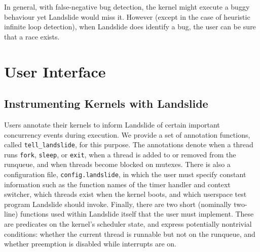 \documentclass{llncs}
\begin{document}
In general, with false-negative bug detection, the kernel might execute a buggy behaviour yet Landslide would miss it. However (except in the case of heuristic infinite loop detection), when Landslide does identify a bug, the user can be sure that a race exists.



\squish
\section{User Interface}
\squish
\label{sec:interface}

\subsection{Instrumenting Kernels with Landslide}
\squish
\label{sec:instrument}

Users annotate their kernels to inform Landslide of certain important concurrency events during execution. We provide a set of annotation functions, called \texttt{tell\_landslide}, for this purpose. The annotations denote when a thread runs \texttt{fork}, \texttt{sleep}, or \texttt{exit}, when a thread is added to or removed from the runqueue, and when threads become blocked on mutexes.
There is also a configuration file, \texttt{config.landslide}, in which the user must specify constant information such as the function names of the timer handler and context switcher, which threads exist when the kernel boots, and which userspace test program Landslide should invoke.
Finally, there are two short (nominally two-line) functions used within Landslide itself that the user must implement. These are predicates on the kernel's scheduler state, and express potentially nontrivial conditions: whether the current thread is runnable but not on the runqueue, and whether preemption is disabled while interrupts are on.
\end{document}
